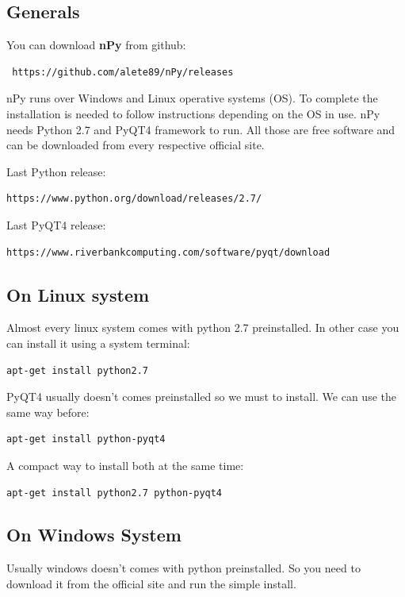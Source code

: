 \documentclass[a4paper,10pt]{article}
\begin{document}
\subsection{Generals}

You can download \textbf{nPy} from github: 
\begin{verbatim}
 https://github.com/alete89/nPy/releases
\end{verbatim}

nPy runs over Windows and Linux operative systems (OS). To complete the installation is needed to follow instructions depending on the OS in use. nPy needs Python 2.7 and PyQT4 framework to run. All those are free software and can be downloaded from every respective official site.
\bigskip 

\noindent Last Python release: 
\begin{verbatim}
https://www.python.org/download/releases/2.7/
\end{verbatim}

\noindent Last PyQT4 release: \begin{verbatim}    
https://www.riverbankcomputing.com/software/pyqt/download
\end{verbatim}
  
\subsection{On Linux system}

Almost every linux system comes with python 2.7 preinstalled. In other case you can install it using a system terminal:
\begin{verbatim}
apt-get install python2.7
\end{verbatim}

\noindent PyQT4 usually doesn't comes preinstalled so we must to install. We can use the same way before:
\begin{verbatim}
apt-get install python-pyqt4 
\end{verbatim}

\noindent A compact way to install both at the same time:
\begin{verbatim}
apt-get install python2.7 python-pyqt4 
\end{verbatim}

\subsection{On Windows System}

Usually windows doesn't comes with python preinstalled. So you need to download it from the official site and run the simple install.
\end{document}
